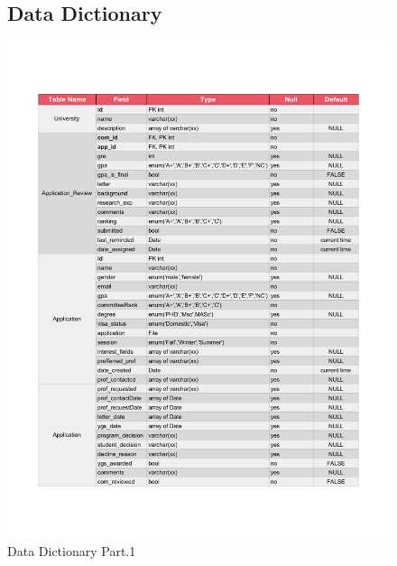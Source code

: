 \documentclass[fontsize=12pt,paper=letter,twoside]{scrartcl}
\begin{document}
\begin{figure}[!htb]
\subsection{Data Dictionary}
\begin{center}
\includegraphics[width=\textwidth]{images/data_dictionary1.pdf}
\end{center}
\caption{Data Dictionary Part.1}
\label{fig:dd1}
\end{figure}

\clearpage
\newpage
\end{document}
